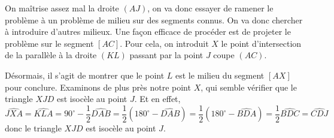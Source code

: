 \begin{sol}
\begin{center}
\end{center}

On maîtrise assez mal la droite $(AJ)$, on va donc essayer de ramener le problème à un problème de milieu sur des segments connus. On va donc chercher à introduire d'autres milieux. Une façon efficace de procéder est de projeter le problème sur le segment $[AC]$. Pour cela, on introduit $X$ le point d'intersection de la parallèle à la droite $(KL)$ passant par la point $J$ coupe $(AC)$.

Désormais, il s'agit de montrer que le point $L$ est le milieu du segment $[AX]$ pour conclure. Examinons de plus près notre point $X$, qui semble vérifier que le triangle $XJD$ est isocèle au point $J$. Et en effet,
$$\widehat{JXA}=\widehat{KLA}=90^\circ-\frac{1}{2}\widehat{DAB}=\frac{1}{2}(180^\circ-\widehat{DAB})=\frac{1}{2}(180^\circ-\widehat{BDA})=\frac{1}{2}\widehat{BDC}=\widehat{CDJ}$$ donc le triangle $XJD$ est isocèle au point $J$.


\end{sol}
